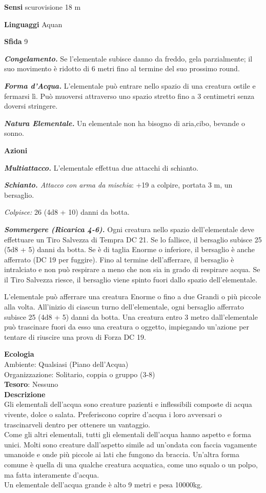 \begin{multicols}{2}
\textbf{Sensi} scurovisione 18 m

\textbf{Linguaggi} Aquan

\textbf{Sfida} 9

\textit{\textbf{Congelamento.}} Se l'elementale subisce danno da freddo, gela parzialmente; il suo movimento è ridotto di 6 metri fino al termine del suo prossimo round.

\textit{\textbf{Forma d'Acqua.}} L'elementale può entrare nello spazio di una creatura ostile e fermarsi lì. Può muoversi attraverso uno spazio stretto fino a 3 centimetri senza doversi stringere.

\textit{\textbf{Natura Elementale.}} Un elementale non ha bisogno di aria,cibo, bevande o sonno.

\textbf{Azioni}

\textit{\textbf{Multiattacco.}} L'elementale effettua due attacchi di schianto.

\textit{\textbf{Schianto.} Attacco con arma da mischia}: +19 a colpire, portata 3 m, un bersaglio.

\textit{Colpisce:} 26 (4d8 + 10) danni da botta.

\textit{\textbf{Sommergere (Ricarica 4-6).}} Ogni creatura nello spazio dell'elementale deve effettuare un Tiro Salvezza di Tempra DC 21. Se lo fallisce, il bersaglio subisce 25 (5d8 + 5) danni da botta. Se è di taglia Enorme o inferiore, il bersaglio è anche afferrato (DC 19 per fuggire). Fino al termine dell'afferrare, il bersaglio è intralciato e non può respirare a meno che non sia in grado di respirare acqua. Se il Tiro Salvezza riesce, il bersaglio viene spinto fuori dallo spazio dell'elementale.

L'elementale può afferrare una creatura Enorme o fino a due Grandi o più piccole alla volta. All'inizio di ciascun turno dell'elementale, ogni bersaglio afferrato subisce 25 (4d8 + 5) danni da botta. Una creatura entro 3 metro dall'elementale può trascinare fuori da esso una creatura o oggetto, impiegando un'azione per tentare di riuscire una prova di Forza DC 19.

\textbf{Ecologia}\\
Ambiente: Qualsiasi (Piano dell'Acqua)\\
Organizzazione: Solitario, coppia o gruppo (3-8)\\
\textbf{Tesoro}: Nessuno\\
\textbf{Descrizione}\\
Gli elementali dell'acqua sono creature pazienti e inflessibili composte di acqua vivente, dolce o salata. Preferiscono coprire d'acqua i loro avversari o trascinarveli dentro per ottenere un vantaggio.\\
Come gli altri elementali, tutti gli elementali dell'acqua hanno aspetto e forma unici. Molti sono creature dall'aspetto simile ad un'ondata con faccia vagamente umanoide e onde più piccole ai lati che fungono da braccia. Un'altra forma comune è quella di una qualche creatura acquatica, come uno squalo o un polpo, ma fatta interamente d'acqua.\\
Un elementale dell'acqua grande è alto 9 metri e pesa 10000kg.


\end{multicols}

